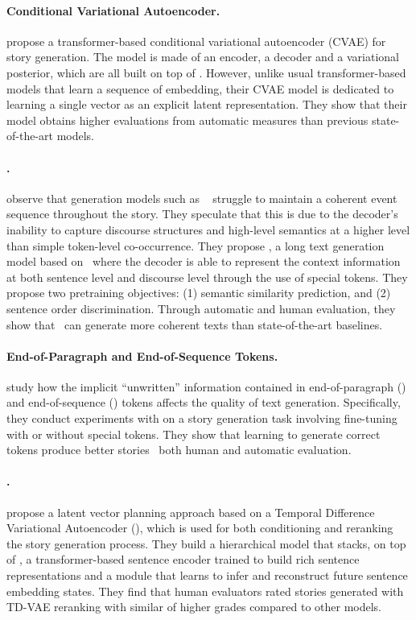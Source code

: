 \paragraph{Conditional Variational Autoencoder.}
\citet{fang2021transformer} propose a transformer-based conditional variational autoencoder (CVAE) for story generation. The model is made of an encoder, a decoder and a variational posterior, which are all built on top of {\gptt} \citep{radford2019language}. However, unlike usual transformer-based models that learn a sequence of embedding, their CVAE model is dedicated to learning a single vector as an explicit latent representation. They show that their model obtains higher evaluations from automatic measures than previous state-of-the-art models.

\paragraph{\hint.}
\citet{guan2021long} observe that generation models such as \bart\ \citep{lewis2019bart} struggle to maintain a coherent event sequence throughout the story. They speculate that this is due to the decoder's inability to capture discourse structures and high-level semantics at a higher level than simple token-level co-occurrence. They propose \hint, a long text generation model based on \bart\ where the decoder is able to represent the context information at both sentence level and discourse level through the use of special tokens. They propose two pretraining objectives: (1) semantic similarity prediction, and (2) sentence order discrimination. Through automatic and human evaluation, they show that \hint\ can generate more coherent texts than state-of-the-art baselines.

\paragraph{End-of-Paragraph and End-of-Sequence Tokens.}
\citet{bai2021semantics} study how the implicit ``unwritten'' information contained in end-of-paragraph (\eop) and end-of-sequence (\eos) tokens affects the quality of text generation. Specifically, they conduct experiments with {\gptt} on a story generation task involving fine-tuning with or without special tokens. They show that learning to generate correct {\eop} tokens produce better stories {\wrt}\ both human and automatic evaluation.

\paragraph{\tdvae.}
\citet{wilmot2021temporal} propose a latent vector planning approach based on a Temporal Difference Variational Autoencoder (\tdvae), which is used for both conditioning and reranking the story generation process. They build a hierarchical model that stacks, on top of {\gptt}, a transformer-based sentence encoder trained to build rich sentence representations and a {\tdvae} module that learns to infer and reconstruct
future sentence embedding states. They find that human evaluators rated stories generated with TD-VAE reranking with similar of higher grades compared to other models.

